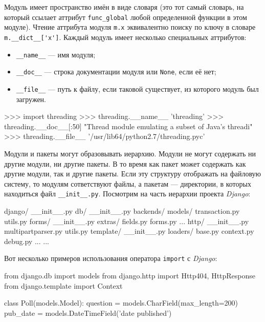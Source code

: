 Модуль имеет пространство имён в виде словаря (это тот самый словарь, на который ссылает аттрибут \lstinline{func_global} любой определенной функции в этом модуле). Чтение аттрибута модуля \lstinline{m.x} эквивалентно поиску по ключу в словаре \lstinline{m.__dict__['x']}. Каждый модуль имеет несколько специальных аттрибутов:
\begin{itemize}
  \item \lstinline{__name__} — имя модуля;
  \item \lstinline{__doc__} — строка документации модуля или \lstinline{None}, если её нет;
  \item \lstinline{__file__} — путь к файлу, если таковой существует, из которого модуль был загружен.
\end{itemize}

\begin{pylst}{}{}
>>> import threading
>>> threading.__name__
'threading'
>>> threading.__doc__[:50]
"Thread module emulating a subset of Java's threadi"
>>> threading.__file__
'/usr/lib64/python2.7/threading.pyc'
\end{pylst}

Модули и пакеты могут образовывать иерархию. Модули не могут содержать ни другие модули, ни другие пакеты. В то время как пакет может содержать как другие модули, так и другие пакеты. Если эту структуру отображать на файловую систему, то модулям сответствуют файлы, а пакетам — директории, в которых находиться файл \lstinline{__init__.py}. Посмотрим на часть иерархии проекта \emph{Django}:
\begin{plainlst}{}{}
django/
       __init__.py
       db/
                 __init__.py
                 backends/
                 models/
                 transaction.py
                 utils.py
       forms/
                 __init__.py
                 extras/
                 fields.py
                 forms.py
                 ...
       http/
                 __init__.py
                 multipartparser.py
                 utils.py
       template/
                 __init__.py
                 loaders/
                 base.py
                 context.py
                 debug.py
                 ...
       ...
\end{plainlst}

Вот несколько примеров использования оператора \lstinline{import} с \emph{Django}:
\begin{pylst}{}{}
from django.db import models
from django.http import Http404, HttpResponse
from django.template import Context

class Poll(models.Model):
    question = models.CharField(max_length=200)
    pub_date = models.DateTimeField('date published')
\end{pylst}

